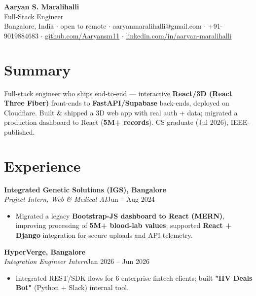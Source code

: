 \documentclass[10pt,a4paper]{article}
\begin{document}
\vspace*{-1cm}
\begin{center}
{\LARGE\bfseries Aaryan S. Maralihalli}\\[0.5em]
{\large Full-Stack Engineer}\\[0.3em]
Bangalore, India $\cdot$ open to remote $\cdot$ aaryanmaralihalli@gmail.com $\cdot$ +91-9019884683 $\cdot$ \href{https://github.com/Aaryansm11}{github.com/Aaryansm11} $\cdot$ \href{https://linkedin.com/in/aaryan-maralihalli}{linkedin.com/in/aaryan-maralihalli}
\end{center}\vspace{0.4ex}
\section*{Summary}
Full-stack engineer who ships end-to-end --- interactive \textbf{React/3D (React Three Fiber)} front-ends to \textbf{FastAPI/Supabase} back-ends, deployed on Cloudflare. Built \& shipped a 3D web app with real auth + data; migrated a production dashboard to React (\textbf{5M+ records}). CS graduate (Jul 2026), IEEE-published.\par\vspace{2pt}
\section*{Experience}
\vspace{1pt}\textbf{Integrated Genetic Solutions (IGS), Bangalore}\\
\textit{Project Intern, Web \& Medical AI}\hfill Jun -- Aug 2024\par\vspace{1pt}
\begin{itemize}
\item Migrated a legacy \textbf{Bootstrap-JS dashboard to React (MERN)}, improving processing of \textbf{5M+ blood-lab values}; supported \textbf{React + Django} integration for secure uploads and API telemetry.
\end{itemize}
\vspace{1pt}\textbf{HyperVerge, Bangalore}\\
\textit{Integration Engineer Intern}\hfill Jan 2026 -- Jun 2026\par\vspace{1pt}
\begin{itemize}
\item Integrated REST/SDK flows for 6 enterprise fintech clients; built \textbf{"HV Deals Bot"} (Python + Slack) internal tool.
\end{itemize}
\end{document}

